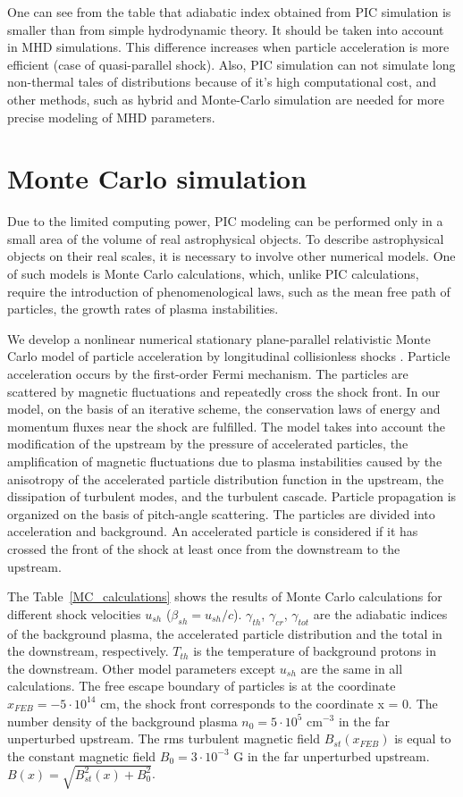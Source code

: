 \documentclass[a4paper]{jpconf}
\begin{document}
    
One can see from the table that adiabatic index obtained from PIC simulation is smaller than from simple hydrodynamic theory. It should be taken into account in MHD simulations. This difference increases when particle acceleration is more efficient (case of quasi-parallel shock). Also, PIC simulation can not simulate long non-thermal tales of distributions because of it's high computational cost, and other methods, such as hybrid and Monte-Carlo simulation are needed for more precise modeling of MHD parameters.

\section{Monte Carlo simulation}	
Due to the limited computing power, PIC modeling can be performed only in a small area of the volume of real astrophysical objects. To describe astrophysical objects on their real scales, it is necessary to involve other numerical models. One of such models is Monte Carlo calculations, which, unlike PIC calculations, require the introduction of phenomenological laws, such as the mean free path of particles, the growth rates of plasma instabilities.


We develop a nonlinear numerical stationary plane-parallel relativistic Monte Carlo model of particle acceleration by longitudinal collisionless shocks \cite{BRO22_Univ}. Particle acceleration occurs by the first-order Fermi mechanism. The particles are scattered by magnetic fluctuations and repeatedly cross the shock front. In our model, on the basis of an iterative scheme, the conservation laws of energy and momentum fluxes near the shock are fulfilled. The model takes into account the modification of the upstream by the pressure of accelerated particles, the amplification of magnetic fluctuations due to plasma instabilities caused by the anisotropy of the accelerated particle distribution function in the upstream, the dissipation of turbulent modes, and the turbulent cascade. Particle propagation is organized on the basis of pitch-angle scattering. The particles are divided into acceleration and background. An accelerated particle is considered if it has crossed the front of the shock at least once from the downstream to the upstream.


The Table~\ref{MC_calculations} shows the results of Monte Carlo calculations for different shock velocities $u_{sh}$ ($\beta_{sh}=u_{sh}/c$). ${\gamma}_{th}$, ${\gamma}_{cr}$, ${\gamma}_{tot}$ are the adiabatic indices of the background plasma, the accelerated particle distribution and the total in the downstream, respectively. $T_{th}$ is the temperature of background protons in the downstream. Other model parameters except $u_{sh}$ are the same in all calculations. The free escape boundary of particles is at the coordinate $x_{FEB}=-5\cdot 10^{14}$ cm, the shock front corresponds to the coordinate x = 0. The number density of the background plasma $n_{0}=5\cdot 10^{5}$ cm$^{-3}$ in the far unperturbed upstream. The rms turbulent magnetic field $B_{st}\left(x_{FEB}\right)$ is equal to the constant magnetic field $B_{0}=3\cdot 10^{-3}$ G in the far unperturbed upstream. $B\left(x\right)=\sqrt{B_{st}^{2}\left(x\right)+B_{0}^{2}}$.
\end{document}
